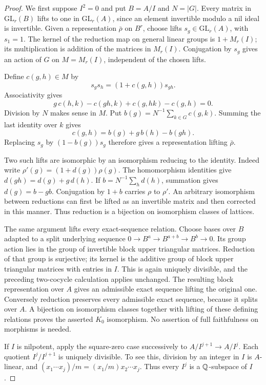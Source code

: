 \begin{proof}
We first suppose $I^2=0$ and put $B=A/I$ and $N=|G|$.
Every matrix in $\mathrm{GL}_r(B)$ lifts to one in
$\mathrm{GL}_r(A)$, since an element invertible modulo a nil ideal
is invertible.  Given a representation $\bar\rho$ on $B^r$,
choose lifts $s_g\in\mathrm{GL}_r(A)$, with $s_1=1$.
The kernel of the reduction map on general linear groups is
$1+M_r(I)$; its multiplication is addition of the matrices in
$M_r(I)$.  Conjugation by $s_g$ gives an action of $G$ on
$M=M_r(I)$, independent of the chosen lifts.

Define $c(g,h)\in M$ by
\[
 s_gs_h=(1+c(g,h))s_{gh}.
\]
Associativity gives
\[
 g\,c(h,k)-c(gh,k)+c(g,hk)-c(g,h)=0.
\]
Division by $N$ makes sense in $M$.  Put
$b(g)=N^{-1}\sum_{k\in G}c(g,k)$.  Summing the last identity
over $k$ gives
\[
 c(g,h)=b(g)+g\,b(h)-b(gh).
\]
Replacing $s_g$ by $(1-b(g))s_g$ therefore gives a representation
lifting $\bar\rho$.

Two such lifts are isomorphic by an isomorphism reducing to the
identity.  Indeed write $\rho'(g)=(1+d(g))\rho(g)$.
The homomorphism identities give
$d(gh)=d(g)+g\,d(h)$.  If
$b=N^{-1}\sum_h d(h)$, summation gives $d(g)=b-gb$.
Conjugation by $1+b$ carries $\rho$ to $\rho'$.
An arbitrary isomorphism between reductions can first be lifted
as an invertible matrix and then corrected in this manner.
Thus reduction is a bijection on isomorphism classes of lattices.

The same argument lifts every exact-sequence relation.  Choose
bases over $B$ adapted to a split underlying sequence
$0\to B^a\to B^{a+b}\to B^b\to0$.
Its group action lies in the group of invertible block upper
triangular matrices.  Reduction of that group is surjective;
its kernel is the additive group of block upper triangular
matrices with entries in $I$.  This is again uniquely divisible,
and the preceding two-cocycle calculation applies unchanged.
The resulting block representation over $A$ gives an admissible
exact sequence lifting the original one.  Conversely reduction
preserves every admissible exact sequence, because it splits over
$A$.  A bijection on isomorphism classes together with lifting
of these defining relations proves the asserted $K_0$ isomorphism.
No assertion of full faithfulness on morphisms is needed.

If $I$ is nilpotent, apply the square-zero case successively to
$A/I^{j+1}\to A/I^j$.  Each quotient $I^j/I^{j+1}$ is
uniquely divisible.  To see this, division by an integer in $I$
is $A$-linear, and
$(x_1\cdots x_j)/m=(x_1/m)x_2\cdots x_j$.
Thus every $I^j$ is a $\mathbb Q$-subspace of $I$.


\end{proof}
